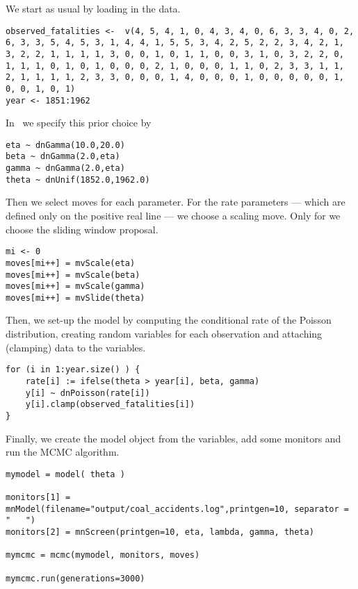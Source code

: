 We start as usual by loading in the data.
{\tt \begin{snugshade*}
\begin{lstlisting} 
observed_fatalities <-  v(4, 5, 4, 1, 0, 4, 3, 4, 0, 6, 3, 3, 4, 0, 2, 6, 3, 3, 5, 4, 5, 3, 1, 4, 4, 1, 5, 5, 3, 4, 2, 5, 2, 2, 3, 4, 2, 1, 3, 2, 2, 1, 1, 1, 1, 3, 0, 0, 1, 0, 1, 1, 0, 0, 3, 1, 0, 3, 2, 2, 0, 1, 1, 1, 0, 1, 0, 1, 0, 0, 0, 2, 1, 0, 0, 0, 1, 1, 0, 2, 3, 3, 1, 1, 2, 1, 1, 1, 1, 2, 3, 3, 0, 0, 0, 1, 4, 0, 0, 0, 1, 0, 0, 0, 0, 0, 1, 0, 0, 1, 0, 1)
year <- 1851:1962
\end{lstlisting}
\end{snugshade*}}
In \Rev~we specify this prior choice by
{\tt \begin{snugshade*}
\begin{lstlisting} 
eta ~ dnGamma(10.0,20.0)
beta ~ dnGamma(2.0,eta)
gamma ~ dnGamma(2.0,eta)
theta ~ dnUnif(1852.0,1962.0)
\end{lstlisting}
\end{snugshade*}}
Then we select moves for each parameter.
For the rate parameters --- which are defined only on the positive real line --- we choose a scaling move.
Only for  we choose the sliding window proposal.
{\tt \begin{snugshade*}
\begin{lstlisting} 
mi <- 0
moves[mi++] = mvScale(eta)
moves[mi++] = mvScale(beta)
moves[mi++] = mvScale(gamma)
moves[mi++] = mvSlide(theta)
\end{lstlisting}
\end{snugshade*}}
Then, we set-up the model by computing the conditional rate of the Poisson distribution, creating random variables for each observation and attaching (clamping) data to the variables.
{\tt \begin{snugshade*}
\begin{lstlisting} 
for (i in 1:year.size() ) {
    rate[i] := ifelse(theta > year[i], beta, gamma)
    y[i] ~ dnPoisson(rate[i])
    y[i].clamp(observed_fatalities[i])
}
\end{lstlisting}
\end{snugshade*}}
Finally, we create the model object from the variables, add some monitors and run the MCMC algorithm.
{\tt \begin{snugshade*}
\begin{lstlisting} 
mymodel = model( theta )

monitors[1] = mnModel(filename="output/coal_accidents.log",printgen=10, separator = "	")
monitors[2] = mnScreen(printgen=10, eta, lambda, gamma, theta)

mymcmc = mcmc(mymodel, monitors, moves)

mymcmc.run(generations=3000)
\end{lstlisting}
\end{snugshade*}}




